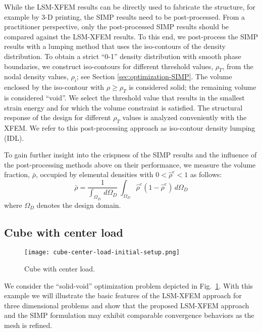 While the LSM-XFEM results can be directly used to fabricate the structure, for example by 3-D printing, the SIMP results need to be post-processed. From a practitioner perspective, only the post-processed SIMP results should be compared against the LSM-XFEM results. To this end, we post-process the SIMP results with a lumping method that uses the iso-contours of the density distribution. To obtain a strict ``0-1'' density distribution with smooth phase boundaries, we construct iso-contours for different threshold values, $\rho_T$, from the nodal density values, $\rho_i$; see Section \ref{sec:optimization-SIMP}. The volume enclosed by the iso-contour with $\rho \ge \rho_T$ is considered solid; the remaining volume is considered ``void''. We select the threshold value that results in the smallest strain energy and for which the volume constraint is satisfied. The structural response of the design for different $\rho_T$ values is analyzed conveniently with the XFEM. We refer to this post-processing approach as iso-contour density lumping (IDL).
 
To gain further insight into the crispness of the SIMP results and the influence of the post-processing methods above on their performance, we measure the volume fraction, $\bar{\rho}$, occupied by elemental densities with $0 < \hat{\rho}^e < 1$ as follows:
%
\begin{equation}
\label{eq:rho-utilization}
	\bar{\rho} = \frac{1}{ \int_{\Omega_D} {} \,d\Omega_D } \ \int_{\Omega_D} { \hat{\rho}^e  ( 1 - \hat{\rho}^e ) } \,
	d\Omega_D
\end{equation}
%
where $\Omega_D$ denotes the design domain.


\subsection{Cube with center load}
\label{sec:cube-center-load}
%
\begin{figure}[ht!]
	\centering
	\texttt{[image: cube-center-load-initial-setup.png]}
	\caption{Cube with center load.}
	\label{fig:cube-center-load-initial-setup}
\end{figure}
%
We consider the ``solid-void'' optimization problem depicted in Fig.~\ref{fig:cube-center-load-initial-setup}. With this example we will illustrate the basic features of the LSM-XFEM approach for three dimensional problems and show that the proposed LSM-XFEM approach and the SIMP formulation may exhibit comparable convergence behaviors as the mesh is refined.

